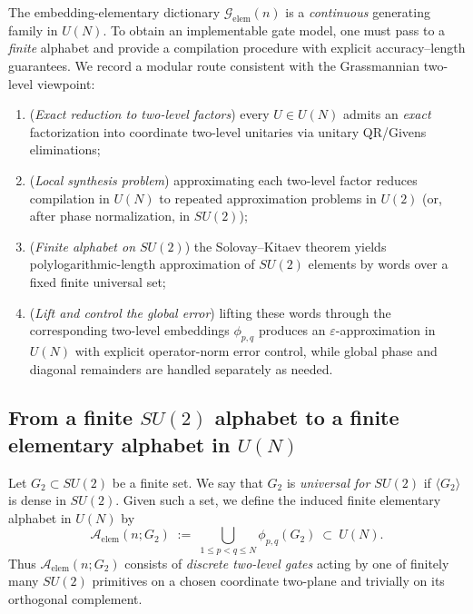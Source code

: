 \documentclass{article}%
\theoremstyle{definition}
\numberwithin{equation}{section}
\begin{document}
\noindent
The embedding-elementary dictionary $\mathcal{G}_{\mathrm{elem}}(n)$ is a \emph{continuous} generating family in $U(N)$.
To obtain an implementable gate model, one must pass to a \emph{finite} alphabet and provide a compilation procedure with explicit
accuracy--length guarantees. We record a modular route consistent with the Grassmannian two-level viewpoint:
\begin{enumerate}
\item[(1)] (\emph{Exact reduction to two-level factors}) every $U\in U(N)$ admits an \emph{exact} factorization into coordinate two-level
unitaries via unitary QR/Givens eliminations;
\item[(2)] (\emph{Local synthesis problem}) approximating each two-level factor reduces compilation in $U(N)$ to repeated approximation
problems in $U(2)$ (or, after phase normalization, in $SU(2)$);
\item[(3)] (\emph{Finite alphabet on $SU(2)$}) the Solovay--Kitaev theorem yields polylogarithmic-length approximation of $SU(2)$ elements
by words over a fixed finite universal set;
\item[(4)] (\emph{Lift and control the global error}) lifting these words through the corresponding two-level embeddings $\phi_{p,q}$
produces an $\varepsilon$-approximation in $U(N)$ with explicit operator-norm error control, while global phase and diagonal remainders
are handled separately as needed.
\end{enumerate}

\subsection{From a finite $SU(2)$ alphabet to a finite elementary alphabet in $U(N)$}
\label{subsec:finite_alphabet}

Let $G_2\subset SU(2)$ be a finite set. We say that $G_2$ is \emph{universal for $SU(2)$} if $\langle G_2\rangle$ is dense in $SU(2)$.
Given such a set, we define the induced finite elementary alphabet in $U(N)$ by
\begin{equation}\label{eq:finite_embedded_alphabet}
\mathcal{A}_{\mathrm{elem}}(n;G_2)
\;:=\;
\bigcup_{1\le p<q\le N}\phi_{p,q}(G_2)\ \subset\ U(N).
\end{equation}
Thus $\mathcal{A}_{\mathrm{elem}}(n;G_2)$ consists of \emph{discrete two-level gates} acting by one of finitely many $SU(2)$ primitives
on a chosen coordinate two-plane and trivially on its orthogonal complement.
\end{document}
